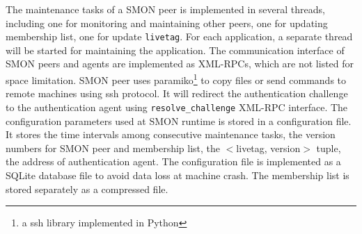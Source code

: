 The maintenance tasks of a SMON peer is implemented in
several threads, including one for monitoring and
maintaining other peers, one for updating membership list,
one for update \texttt{livetag}. For each application, a
separate thread will be started for maintaining the
application.
The communication interface of SMON peers and agents are
implemented as XML-RPCs, which are not listed for space
limitation.
SMON peer uses paramiko\footnote{a ssh library implemented
in Python} to copy files or send commands to remote machines
using ssh protocol. It will redirect the authentication
challenge to the authentication agent using
\texttt{resolve\_challenge} XML-RPC interface.
The configuration parameters used at SMON runtime is stored
in a configuration file. It stores the time intervals among
consecutive maintenance tasks, the version numbers for SMON
peer and membership list, the $<$livetag, version$>$ tuple,
the address of authentication agent. The configuration file
is implemented as a SQLite database file to avoid data loss
at machine crash. The membership list is stored separately
as a compressed file.



